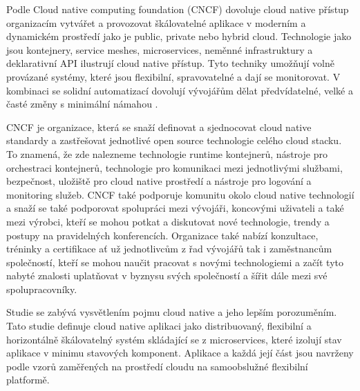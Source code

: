         Podle Cloud native computing foundation (CNCF) dovoluje cloud native přístup organizacím vytvářet a provozovat škálovatelné aplikace v moderním a dynamickém prostředí jako je public, private nebo hybrid cloud. Technologie jako jsou kontejnery, service meshes, microservices, neměnné infrastruktury a deklarativní API ilustrují cloud native přístup. Tyto techniky umožňují volně provázané systémy, které jsou flexibilní, spravovatelné a dají se monitorovat. V kombinaci se solidní automatizací dovolují vývojářům dělat předvídatelné, velké a časté změny s minimální námahou \cite{CNCFdefinition}. \par
	CNCF je organizace, která se snaží definovat a sjednocovat cloud native standardy a zastřešovat jednotlivé open source technologie celého cloud stacku. To znamená, že zde nalezneme technologie runtime kontejnerů, nástroje pro orchestraci kontejnerů, technologie pro komunikaci mezi jednotlivými službami, bezpečnost, uložiště pro cloud native prostředí a nástroje pro logování a monitoring služeb. CNCF také podporuje komunitu okolo cloud native technologií a snaží se také podporovat spolupráci mezi vývojáři, koncovými uživateli a také mezi výrobci, kteří se mohou potkat a diskutovat nové technologie, trendy a postupy na pravidelných konferencích. Organizace také nabízí konzultace, tréninky a certifikace ať už jednotlivcům z řad vývojářů tak i zaměstnancům společností, kteří se mohou naučit pracovat s novými technologiemi a začít tyto nabyté znalosti uplatňovat v byznysu svých společností a šířit dále mezi své spolupracovníky. \par
	    Studie \cite{KRATZKE} se zabývá vysvětlením pojmu cloud native a jeho lepším porozuměním. Tato studie definuje cloud native aplikaci jako distribuovaný, flexibilní a horizontálně škálovatelný systém skládající se z microservices, které izolují stav aplikace v minimu stavových komponent. Aplikace a každá její část jsou navrženy podle vzorů zaměřených na prostředí cloudu na samoobslužné flexibilní platformě. \par
	        
